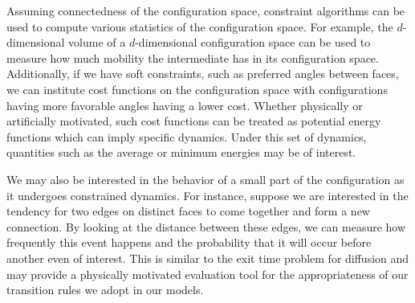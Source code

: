\documentclass[12pt]{article}
\begin{document}
Assuming connectedness of the configuration space, constraint algorithms can be used to compute various statistics of the configuration space. For example, the $d$-dimensional volume of a $d$-dimensional configuration space can be used to measure how much mobility the intermediate has in its configuration space. Additionally, if we have soft constraints, such as preferred angles between faces, we can institute cost functions on the configuration space with configurations having more favorable angles having a lower cost. Whether physically or artificially motivated, such cost functions can be treated as potential energy functions which can imply specific dynamics. Under this set of dynamics, quantities such as the average or minimum energies may be of interest. 

We may also be interested in the behavior of a small part of the configuration as it undergoes constrained dynamics. For instance, suppose we are interested in the tendency for two edges on distinct faces to come together and form a new connection. By looking at the distance between these edges, we can measure how frequently this event happens and the probability that it will occur before another even of interest. This is similar to the exit time problem for diffusion and may provide a physically motivated evaluation tool for the appropriateness of our transition rules we adopt in our models. 

  
\end{document}
